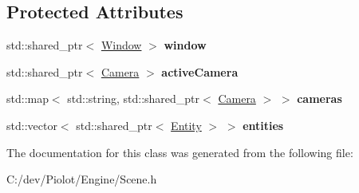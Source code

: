 \subsection*{Protected Attributes}
\begin{DoxyCompactItemize}
\item 
\mbox{\label{classpiolot_1_1_scene_a250749bf646c4ab0349bd98e515b0d5b}} 
std\+::shared\+\_\+ptr$<$ \mbox{\hyperlink{class_window}{Window}} $>$ {\bfseries window}
\item 
\mbox{\label{classpiolot_1_1_scene_a980ee452f49233f7b95fa4643e383ae9}} 
std\+::shared\+\_\+ptr$<$ \mbox{\hyperlink{classpiolot_1_1_camera}{Camera}} $>$ {\bfseries active\+Camera}
\item 
\mbox{\label{classpiolot_1_1_scene_a3fe090e6f4c7747ebf8a675f93985409}} 
std\+::map$<$ std\+::string, std\+::shared\+\_\+ptr$<$ \mbox{\hyperlink{classpiolot_1_1_camera}{Camera}} $>$ $>$ {\bfseries cameras}
\item 
\mbox{\label{classpiolot_1_1_scene_acbfcb0b896570a28a7f2ed83c7426518}} 
std\+::vector$<$ std\+::shared\+\_\+ptr$<$ \mbox{\hyperlink{classpiolot_1_1_entity}{Entity}} $>$ $>$ {\bfseries entities}
\end{DoxyCompactItemize}


The documentation for this class was generated from the following file\+:\begin{DoxyCompactItemize}
\item 
C\+:/dev/\+Piolot/\+Engine/Scene.\+h\end{DoxyCompactItemize}
